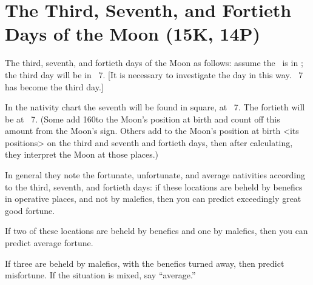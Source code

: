 \section{The Third, Seventh, and Fortieth Days of the Moon (15K, 14P)}
The third, seventh, and fortieth days of the Moon as follows: assume the \Moon\, is in \deg; the third day will be in \Sagittarius\, 7\deg. [It is necessary to investigate the day in this way. \Sagittarius\, 7\deg\, has
become the third day.] 

In the nativity chart the seventh will be found in square, at \Aquarius\, 7\deg. The fortieth will be at \Taurus\, 7\deg. (Some add 160\deg to the Moon’s position at birth and count off this amount from the Moon’s sign. Others add to the Moon’s position at birth <its positions> on the third and seventh
and fortieth days, then after calculating, they interpret the Moon at those places.)

\mndl[0.2cm]
In general they note the fortunate, unfortunate, and average nativities according to the third, seventh, and fortieth days: if these locations are beheld by benefics in operative places, and not by malefics, then you can predict exceedingly great good fortune. 

If two of these locations are beheld by benefics and one by malefics, then you can predict average fortune. 

If three are beheld by malefics, with the benefics turned
away, then predict misfortune. If the situation is mixed, say “average.”

\newpage